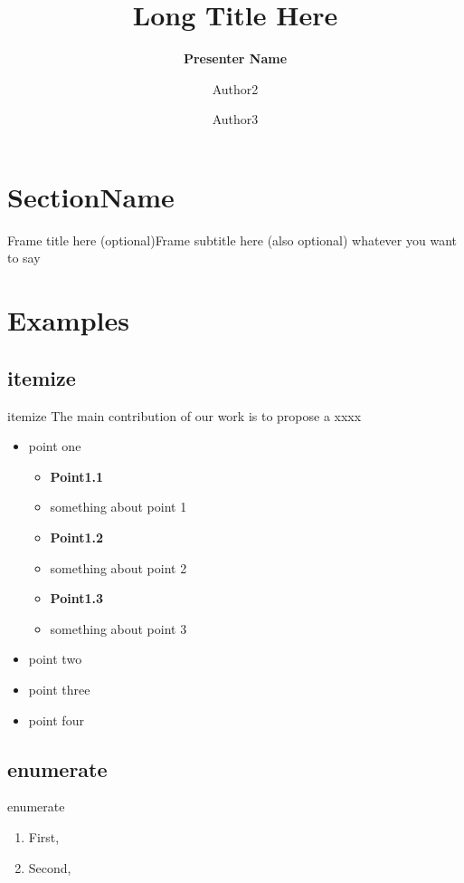 \documentclass{beamer}
\title[Short Title]{Long Title Here}
\author[Presenter Name]{\textbf{Presenter Name} \and Author2 \and Author3}
\institute[Fudan University]{
    School of Computer Science, Fudan University, Shanghai, China \\
    Shanghai Key Laboratory of Data Science, Shanghai, China \\
    Shanghai Institute of Intelligent Electronics \& Systems \\~\\
    \tiny{This work is partially supported by xxx}
}
\begin{document}
\begin{frame}
  \titlepage
\end{frame}

\section{SectionName}
\begin{frame}{Frame title here (optional)}{Frame subtitle here (also optional)}
  whatever you want to say
\end{frame}

\section{Examples}
\subsection{itemize}
\begin{frame}[t]{itemize}
  The main contribution of our work is to propose a xxxx
  \begin{itemize}
    \item point one
          \begin{itemize}
            \item \textbf{Point1.1}
            \item something about point 1
            \item \textbf{Point1.2}
            \item something about point 2
            \item \textbf{Point1.3}
            \item something about point 3
          \end{itemize}
    \item point two
    \item point three
    \item point four
  \end{itemize}
\end{frame}

\subsection{enumerate}
\begin{frame}[t]{enumerate}
  \begin{enumerate}
    \item First,
    \item Second,
  \end{enumerate}
\end{frame}
\end{document}
